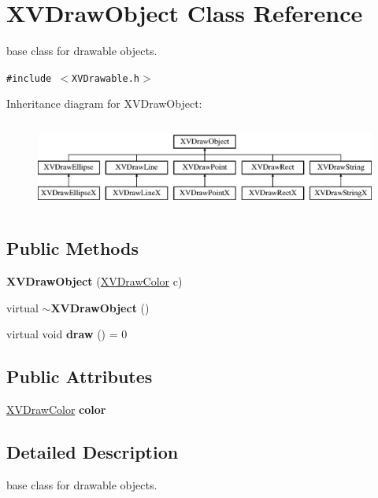 \hypertarget{class_XVDrawObject}{
\section{XVDraw\-Object  Class Reference}
\label{XVDrawObject}
}
base class for drawable objects. 


{\tt \#include $<$XVDrawable.h$>$}

Inheritance diagram for XVDraw\-Object:\begin{figure}[H]
\begin{center}
\leavevmode
\includegraphics[height=2.94737cm]{class_XVDrawObject}
\end{center}
\end{figure}
\subsection*{Public Methods}
\begin{CompactItemize}
\item 
{\bf XVDraw\-Object} (\hyperlink{class_XVDrawColor}{XVDraw\-Color} c)
\item 
virtual {\bf $\sim$XVDraw\-Object} ()
\item 
\label{XVDrawObject_a2}
\hypertarget{class_XVDrawObject_a2}{
virtual void {\bf draw} () = 0}

\end{CompactItemize}
\subsection*{Public Attributes}
\begin{CompactItemize}
\item 
\hyperlink{class_XVDrawColor}{XVDraw\-Color} {\bf color}
\end{CompactItemize}


\subsection{Detailed Description}
base class for drawable objects.





